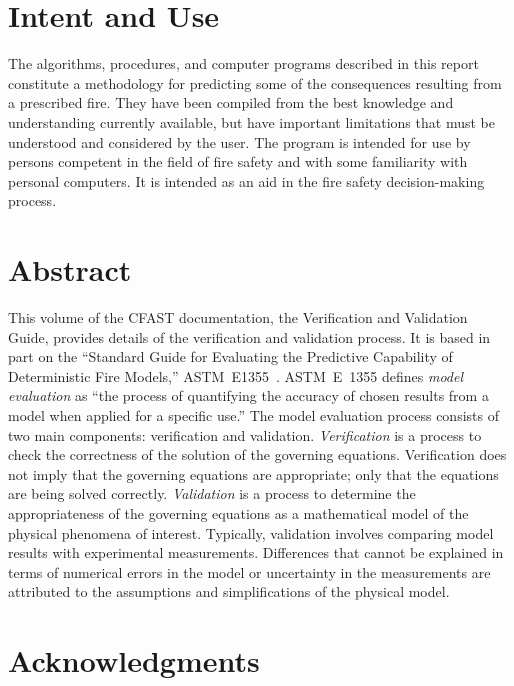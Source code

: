 \documentclass[12pt]{book}
\begin{document}

\chapter{Intent and Use}

The algorithms, procedures, and computer programs described in this report constitute a
methodology for predicting some of the consequences resulting from a prescribed fire.  They
have been compiled from the best knowledge and understanding currently available, but have
important limitations that must be understood and considered by the user.  The program is
intended for use by persons competent in the field of fire safety and with some familiarity with
personal computers. It is intended as an aid in the fire safety decision-making process.

\chapter{Abstract}

This volume of the CFAST documentation, the Verification and Validation Guide, provides details of the verification and validation process. It is based in part on the ``Standard Guide for Evaluating the Predictive Capability of Deterministic Fire Models,'' ASTM~E1355~\cite{CFAST:ASTM:E1355}. ASTM~E~1355 defines {\em model evaluation} as ``the process of quantifying the accuracy of chosen results from a model when applied for a specific use.'' The model evaluation process consists of two main components: verification and validation. {\em Verification} is a process to check the correctness of the solution of the governing equations. Verification does not imply that the governing equations are appropriate; only that the equations are being solved correctly. {\em Validation} is a process to determine the appropriateness of the governing equations as a mathematical model of the physical phenomena of interest. Typically, validation involves comparing model results with experimental measurements. Differences that cannot be explained in terms of numerical errors in the model or uncertainty in the measurements are attributed to the assumptions and simplifications of the physical model.


\chapter{Acknowledgments}

\label{acksection}
\end{document}
